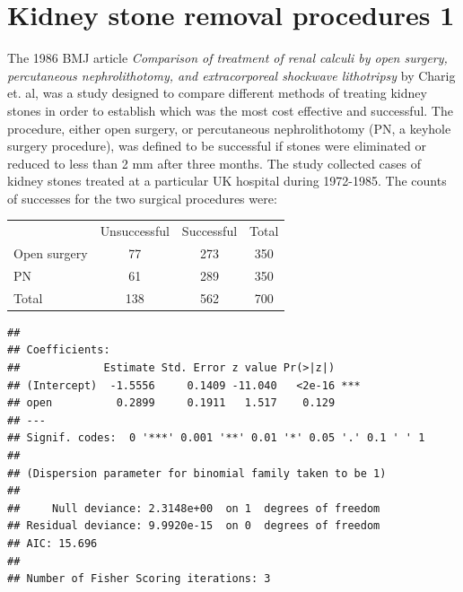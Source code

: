 \documentclass[landscape,twocolumn,letterpaper,9pt,reqno]{article}\usepackage[]{graphicx}\usepackage[]{color}
\newenvironment{knitrout}{}{} %
\begin{document}
\clearpage


\section{Kidney stone removal procedures 1}
The 1986 BMJ article \textit{Comparison of treatment of renal calculi by open surgery, percutaneous nephrolithotomy, and extracorporeal shockwave lithotripsy} by Charig et. al, was a study designed to compare different methods of treating kidney stones in order to establish which was the most cost effective and successful. The procedure, either open surgery, or percutaneous nephrolithotomy (PN, a keyhole surgery procedure), was defined to be successful if stones were eliminated or reduced to less than 2 mm after three months. The study collected cases of kidney stones treated at a particular UK hospital during 1972-1985. The counts of successes for the two surgical procedures were:

\begin{table}[h]
	\centering
	\begin{tabular}{lcc|c}
		& Unsuccessful &  Successful & Total\\
		Open surgery & 77 & 273 & 350 \\
		PN & 61 & 289 & 350 \\
		\hline
		Total & 138 & 562 & 700
	\end{tabular}
\end{table}


\begin{knitrout}
\color{fgcolor}
\begin{verbatim}
## 
## Coefficients:
##             Estimate Std. Error z value Pr(>|z|)    
## (Intercept)  -1.5556     0.1409 -11.040   <2e-16 ***
## open          0.2899     0.1911   1.517    0.129    
## ---
## Signif. codes:  0 '***' 0.001 '**' 0.01 '*' 0.05 '.' 0.1 ' ' 1
## 
## (Dispersion parameter for binomial family taken to be 1)
## 
##     Null deviance: 2.3148e+00  on 1  degrees of freedom
## Residual deviance: 9.9920e-15  on 0  degrees of freedom
## AIC: 15.696
## 
## Number of Fisher Scoring iterations: 3
\end{verbatim}

\end{knitrout}
\end{document}
